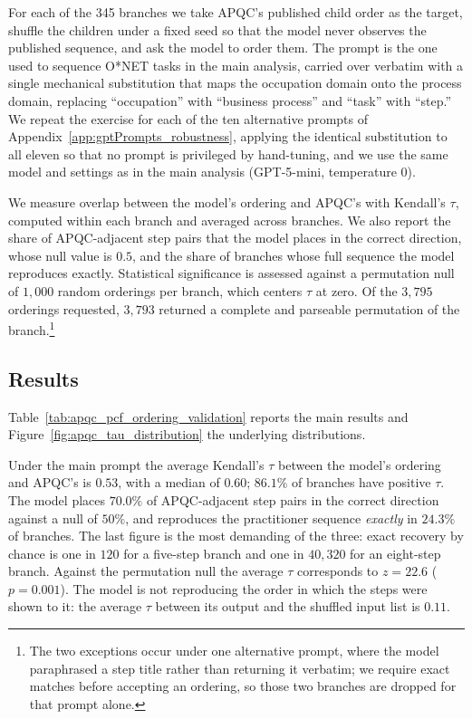 For each of the 345 branches we take APQC's published child order as the target, shuffle the children under a fixed seed so that the model never observes the published sequence, and ask the model to order them.
The prompt is the one used to sequence O*NET tasks in the main analysis, carried over verbatim with a single mechanical substitution that maps the occupation domain onto the process domain, replacing ``occupation'' with ``business process'' and ``task'' with ``step.''
We repeat the exercise for each of the ten alternative prompts of Appendix~\ref{app:gptPrompts_robustness}, applying the identical substitution to all eleven so that no prompt is privileged by hand-tuning, and we use the same model and settings as in the main analysis (GPT-5-mini, temperature $0$).

We measure overlap between the model's ordering and APQC's with Kendall's $\tau$, computed within each branch and averaged across branches.
We also report the share of APQC-adjacent step pairs that the model places in the correct direction, whose null value is $0.5$, and the share of branches whose full sequence the model reproduces exactly.
Statistical significance is assessed against a permutation null of $1{,}000$ random orderings per branch, which centers $\tau$ at zero.
Of the $3{,}795$ orderings requested, $3{,}793$ returned a complete and parseable permutation of the branch.\footnote{The two exceptions occur under one alternative prompt, where the model paraphrased a step title rather than returning it verbatim; we require exact matches before accepting an ordering, so those two branches are dropped for that prompt alone.}

\subsection{Results}
\label{app:apqc_validation_results}

Table~\ref{tab:apqc_pcf_ordering_validation} reports the main results and Figure~\ref{fig:apqc_tau_distribution} the underlying distributions.

Under the main prompt the average Kendall's $\tau$ between the model's ordering and APQC's is $0.53$, with a median of $0.60$; $86.1\%$ of branches have positive $\tau$.
The model places $70.0\%$ of APQC-adjacent step pairs in the correct direction against a null of $50\%$, and reproduces the practitioner sequence \emph{exactly} in $24.3\%$ of branches.
The last figure is the most demanding of the three: exact recovery by chance is one in $120$ for a five-step branch and one in $40{,}320$ for an eight-step branch.
Against the permutation null the average $\tau$ corresponds to $z = 22.6$ ($p = 0.001$).
The model is not reproducing the order in which the steps were shown to it: the average $\tau$ between its output and the shuffled input list is $0.11$.

